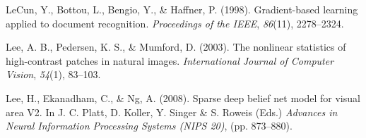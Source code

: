 \documentclass{article} %
\begin{document}
\begin{thebibliography}{100}



LeCun, Y., Bottou, L., Bengio, Y., \& Haffner, P. (1998). 
\newblock Gradient-based learning applied to document recognition. 
\newblock \emph{Proceedings of the IEEE}, \emph{86}(11), 2278--2324.

Lee, A. B., Pedersen, K. S., \& Mumford, D. (2003). 
\newblock The nonlinear statistics of high-contrast patches in natural images. 
\newblock \emph{International Journal of Computer Vision}, \emph{54}(1), 83--103.


Lee, H., Ekanadham, C., \& Ng, A. (2008). 
\newblock Sparse deep belief net model for visual area V2. 
\newblock In J. C. Platt, D. Koller, Y. Singer \& S. Roweis (Eds.) \emph{Advances in Neural Information Processing Systems (NIPS 20)}, (pp. 873--880).



\end{thebibliography}
\end{document}

